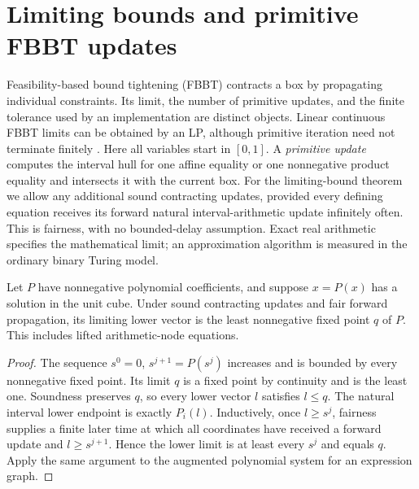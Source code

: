 \section{Limiting bounds and primitive FBBT updates}\label{app:fbbt}
Feasibility-based bound tightening (FBBT) contracts a box by propagating
individual constraints. Its limit, the number of primitive updates, and
the finite tolerance used by an implementation are distinct objects.
Linear continuous FBBT limits can be obtained by an LP, although primitive
iteration need not terminate finitely \citep{BelottiEtAl2012}.
Here all variables start in $[0,1]$. A \emph{primitive update} computes the
interval hull for one affine equality or one nonnegative product equality
and intersects it with the current box. For the limiting-bound theorem
we allow any additional sound contracting updates, provided every defining equation
receives its forward natural interval-arithmetic update infinitely often.
This is fairness, with no bounded-delay assumption. Exact real arithmetic
specifies the mathematical limit; an approximation algorithm is measured
in the ordinary binary Turing model.

\begin{lemma}\label{lem:fbbt-fixed-point}
Let $P$ have nonnegative polynomial coefficients, and suppose $x=P(x)$
has a solution in the unit cube. Under sound contracting updates and fair forward
propagation, its limiting lower vector is the least nonnegative fixed
point $q$ of $P$. This includes lifted arithmetic-node equations.
\end{lemma}
\begin{proof}
The sequence $s^0=0$, $s^{j+1}=P(s^j)$ increases and is bounded by every
nonnegative fixed point. Its limit $q$ is a fixed point by continuity and
is the least one. Soundness preserves $q$, so every lower vector $l$
satisfies $l\le q$. The natural interval lower endpoint is exactly $P_i(l)$.
Inductively, once $l\ge s^j$, fairness supplies a finite later time at
which all coordinates have received a forward update and $l\ge s^{j+1}$.
Hence the lower limit is at least every $s^j$ and equals $q$. Apply the
same argument to the augmented polynomial system for an expression graph.
\end{proof}

